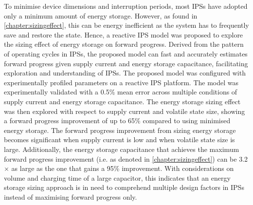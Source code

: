 \begin{enumerate}


To minimise device dimensions and interruption periods, most IPSs have adopted only a minimum amount of energy storage. 
However, as found in \cref{chapter:sizingeffect}, this can be energy inefficient as the system has to frequently save and restore the state. 
Hence, a reactive IPS model was proposed to explore the sizing effect of energy storage on forward progress. 
Derived from the pattern of operating cycles in IPSs, the proposed model can fast and accurately estimates forward progress given supply current and energy storage capacitance, facilitating exploration and understanding of IPSs. 
The proposed model was configured with experimentally profiled parameters on a reactive IPS platform.
The model was experimentally validated with a 0.5\% mean error across multiple conditions of supply current and energy storage capacitance. 
The energy storage sizing effect was then explored with respect to supply current and volatile state size, showing a forward progress improvement of up to 65\% compared to using minimised energy storage.
The forward progress improvement from sizing energy storage becomes significant when supply current is low and when volatile state size is large. 
Additionally, the energy storage capacitance that achieves the maximum forward progress improvement (i.e.  as denoted in \cref{chapter:sizingeffect}) can be 3.2$\times$ as large as the one that gains a 95\% improvement. 
With considerations on volume and charging time of a large capacitor, this indicates that an energy storage sizing approach is in need to comprehend multiple design factors in IPSs instead of maximising forward progress only.



\end{enumerate}
